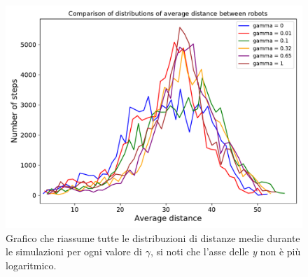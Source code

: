 \begin{figure}
	\centering
	\includegraphics[width=0.9\linewidth]{images/high_priority_gamma_results/high_alpha/comparison}
	\caption{Grafico che riassume tutte le distribuzioni di distanze medie durante le simulazioni per ogni valore di $\gamma$, si noti che l'asse delle \textit{y} non è più logaritmico.}
	\label{fig:NgammaHComparison}
\end{figure}